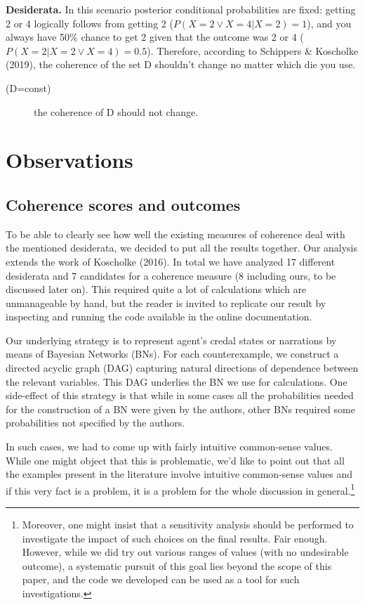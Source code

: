 \documentclass[10pt,]{scrartcl}
\newcommand{\s}[1]{\mbox{\textsf{#1}}}
\begin{document}
\noindent \textbf{Desiderata.} In this scenario posterior conditional
probabilities are fixed: getting 2 or 4 logically follows from getting 2
(\(P(X=2\vee X=4|X=2)=1\)), and you always have 50\% chance to get 2
given that the outcome was 2 or 4 (\(P(X=2|X=2\vee X=4)=0.5\)).
Therefore, according to Schippers \& Koscholke (2019), the coherence of
the set \s{D} shouldn't change no matter which die you use.

\vspace{2mm}

\begin{description}
    \item[(\s{D=const})] the coherence of \s{D} should not change.
\end{description}

\vspace{2mm}

\section{Observations}

\subsection{Coherence scores and outcomes}

To be able to clearly see how well the existing measures of coherence
deal with the mentioned desiderata, we decided to put all the results
together. Our analysis extends the work of Koscholke (2016). In total we
have analyzed 17 different desiderata and 7 candidates for a coherence
measure (8 including ours, to be discussed later on). This required
quite a lot of calculations which are unmanageable by hand, but the
reader is invited to replicate our result by inspecting and running the
code available in the online documentation.

Our underlying strategy is to represent agent's credal states or
narrations by means of Bayesian Networks (BNs). For each counterexample,
we construct a directed acyclic graph (DAG) capturing natural directions
of dependence between the relevant variables. This DAG underlies the BN
we use for calculations. One side-effect of this strategy is that while
in some cases all the probabilities needed for the construction of a BN
were given by the authors, other BNs required some probabilities not
specified by the authors.

In such cases, we had to come up with fairly intuitive common-sense
values. While one might object that this is problematic, we'd like to
point out that all the examples present in the literature involve
intuitive common-sense values and if this very fact is a problem, it is
a problem for the whole discussion in
general.\footnote{Moreover, one might insist that a sensitivity analysis should be performed to investigate the impact of such choices on the final results. Fair enough. However,  while we did try out various ranges of values (with no undesirable outcome), a systematic pursuit of this goal lies beyond the scope of this paper, and the code we developed can be used as a tool for such investigations.}
\end{document}
